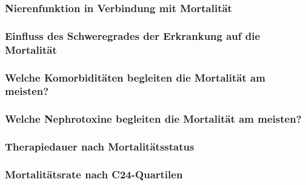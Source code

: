 \documentclass[10pt, aspectratio=169]{beamer}
\begin{document}
\begin{frame}
	\frametitle{Nierenfunktion in Verbindung mit Mortalität }
\end{frame}

\begin{frame}
    \frametitle{Einfluss des Schweregrades der Erkrankung auf die Mortalität}
\end{frame}

\begin{frame}
    \frametitle{Welche Komorbiditäten begleiten die Mortalität am meisten?}
\end{frame}

\begin{frame}
    \frametitle{Welche Nephrotoxine begleiten die Mortalität am meisten?}
\end{frame}

\begin{frame}
    \frametitle{Therapiedauer nach Mortalitätsstatus}
\end{frame}

\begin{frame}
    \frametitle{Mortalitätsrate nach C24-Quartilen}
\end{frame}
\end{document}
